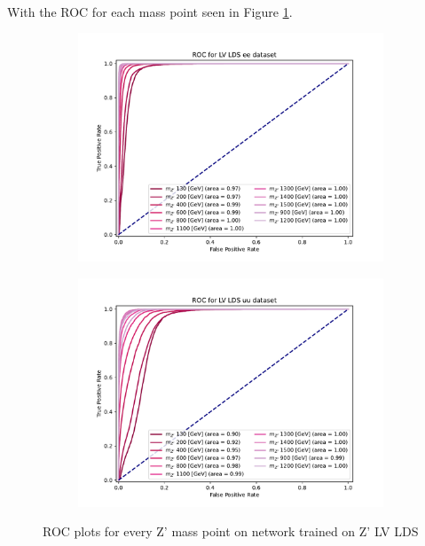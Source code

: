 \documentclass[14pt, a4paper]{book}
\begin{document}
\\With the ROC for each mass point seen in Figure \ref{fig:LV_LDS_ROCS}.
\begin{figure}[!ht]
	\centering
	\begin{subfigure}[b]{0.49\textwidth}
      \centering
      \includegraphics[width=1\textwidth]{XGBoost/LV_LDS/ROC_ee.pdf}
      \end{subfigure}
   \hfill
   \begin{subfigure}[b]{0.49\textwidth}
      \centering
      \includegraphics[width=1\textwidth]{XGBoost/LV_LDS/ROC_uu.pdf}
      \end{subfigure}
   \caption{ROC plots for every Z' mass point on network trained on Z' LV LDS}\label{fig:LV_LDS_ROCS}
\end{figure}
\end{document}
